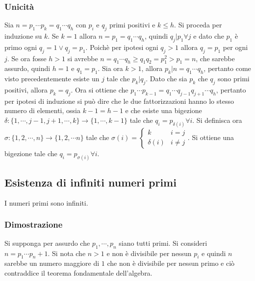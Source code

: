 \subsubsection{Unicit\`a}
Sia $n=p_1\cdots p_k=q_1\cdots q_h$ con $p_i$ e $q_j$ primi positivi e $k\le h$. Si proceda per induzione su $k$. Se $k=1$ allora $n=p_1=q_1\cdots q_h$, quindi $q_j|p_1\forall j$  e dato che $p_1$ \`e
primo ogni $q_j=1\lor q_j=p_1$. Poich\`e per ipotesi ogni $q_j>1$ allora $q_j=p_1$ per ogni $j$. Se ora fosse $h>1$ si avrebbe $n=q_1\cdots q_h\ge q_1q_2=p_1^2>p_1=n$, che sarebbe assurdo, quindi
$h=1$ e $q_1=p_1$. Sia ora $k>1$, allora $p_k|n=q_1\cdots q_h$, pertanto come visto precedentemente esiste un $j$ tale che $p_k|q_j$. Dato che sia $p_k$ che $q_j$ sono primi positivi, allora 
$p_k=q_j$. Ora si ottiene che $p_1\cdots p_{k-1}=q_1\cdots q_{j-1}q_{j+1}\cdots q_h$, pertanto per ipotesi di induzione si pu\`o dire che le due fattorizzazioni hanno lo stesso numero di elementi, ossia 
$k-1=h-1$ e che esiste una bigezione $\delta:\{1,\cdots, j-1,j+1,\cdots, k\}\rightarrow \{1,\cdots, k-1\}$ tale che $q_i=p_{\delta(i)}\forall i$. Si definisca ora $\sigma:\{1,2,\cdots,n\}\rightarrow\{1,2,
\cdots n\}$ tale che $\sigma(i)=\begin{cases}k & i=j\\\delta(i) & i\neq j\end{cases}$. Si ottiene una bigezione tale che $q_i=p_{\sigma(i)}\forall i$.
\subsection{Esistenza di infiniti numeri primi}
I numeri primi sono infiniti.
\subsubsection{Dimostrazione}
Si supponga per assurdo che $p_1,\cdots, p_n$ siano tutti primi. Si consideri $n=p_1\cdots p_n+1$. Si nota che $n>1$ e non \`e divisibile per nessun $p_i$ e quindi $n$ sarebbe un numero maggiore di $1$ 
che non \`e divisibile per nessun primo e ci\`o contraddice il teorema fondamentale dell'algebra.
